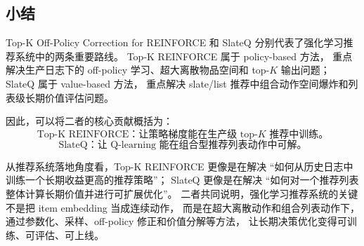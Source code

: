 \documentclass[11pt]{ctexart}
\begin{document}
\subsection{小结}

Top-K Off-Policy Correction for REINFORCE 和 SlateQ 分别代表了强化学习推荐系统中的两条重要路线。
Top-K REINFORCE 属于 policy-based 方法，
重点解决生产日志下的 off-policy 学习、超大离散物品空间和 top-$K$ 输出问题；
SlateQ 属于 value-based 方法，
重点解决 slate/list 推荐中组合动作空间爆炸和列表级长期价值评估问题。

因此，可以将二者的核心贡献概括为：
\[
\text{Top-K REINFORCE：让策略梯度能在生产级 top-}K\text{ 推荐中训练。}
\]
\[
\text{SlateQ：让 Q-learning 能在组合型推荐列表动作中可解。}
\]

从推荐系统落地角度看，Top-K REINFORCE 更像是在解决
``如何从历史日志中训练一个长期收益更高的推荐策略''；
SlateQ 更像是在解决
``如何对一个推荐列表整体计算长期价值并进行可扩展优化''。
二者共同说明，强化学习推荐系统的关键不是把 item embedding 当成连续动作，
而是在超大离散动作和组合列表动作下，
通过参数化、采样、off-policy 修正和价值分解等方法，
让长期决策优化变得可训练、可评估、可上线。
\end{document}
